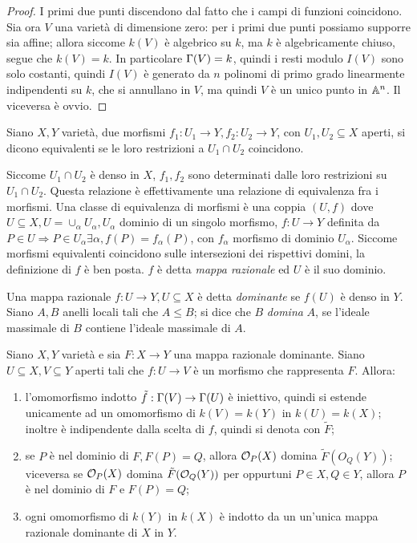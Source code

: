     \begin{proof}
        I primi due punti discendono dal fatto che i campi di funzioni coincidono.\\
        Sia ora $V$ una varietà di dimensione zero: per i primi due punti possiamo supporre sia affine; allora siccome $k(V)$ è algebrico su $k$, ma $k$ è algebricamente chiuso, segue che $k(V) = k$. 
        In particolare $\Gamma(V) = k$, quindi i resti modulo $I(V)$ sono solo costanti, quindi $I(V)$ è generato da $n$ polinomi di primo grado linearmente indipendenti su $k$, che si annullano in $V$, 
        ma quindi $V$ è un unico punto in $\mathbb{A}^n$. Il viceversa è ovvio.
    \end{proof} 
    \begin{definizione}
        Siano $X,Y$ varietà, due morfismi $f_1 : U_1 \to Y, f_2 : U_2 \to Y$, con $U_1,U_2 \subseteq X$ aperti, si dicono equivalenti se le loro restrizioni a $U_1 \cap U_2$ coincidono.
    \end{definizione}
    Siccome $U_1 \cap U_2$ è denso in $X$, $f_1,f_2$ sono determinati dalle loro restrizioni su $U_1 \cap U_2$. Questa relazione è effettivamente una relazione di equivalenza fra i morfismi. Una classe di equivalenza di morfismi è una 
    coppia $(U,f)$ dove $U \subseteq X, U = \cup_{\alpha} U_{\alpha}, U_{\alpha}$ dominio di un singolo morfismo, $f : U \to Y$ definita da $P \in U \Longrightarrow P \in U_{\alpha} \exists \alpha, f(P) = f_{\alpha}(P)$, con $f_{\alpha}$ 
    morfismo di dominio $U_{\alpha}$. Siccome morfismi equivalenti coincidono sulle intersezioni dei rispettivi domini, la definizione di $f$ è ben posta. $f$ è detta \emph{mappa razionale} ed $U$ è il suo dominio.
    \begin{definizione}
        Una mappa razionale $f : U \to Y, U \subseteq X$ è detta \emph{dominante} se $f(U)$ è denso in $Y$.\\
        Siano $A,B$ anelli locali tali che $A \leq B$; si dice che $B$ \emph{domina} $A$, se l'ideale massimale di $B$ contiene l'ideale massimale di $A$. 
    \end{definizione}
    \begin{proposizione}\label{prop:techn1}
        Siano $X,Y$ varietà e sia $F : X \to Y$ una mappa razionale dominante. Siano $U \subseteq X, V \subseteq Y$ aperti tali che $f : U \to V$ è un morfismo che rappresenta $F$. Allora: \begin{enumerate}
            \item l'omomorfismo indotto $\tilde{f} : \Gamma(V) \to \Gamma(U)$ è iniettivo, quindi si estende unicamente ad un omomorfismo di $k(V) = k(Y)$ in $k(U) = k(X)$; inoltre è indipendente dalla scelta di $f$, quindi si denota con $\tilde{F}$;
            \item se $P$ è nel dominio di $F, F(P) = Q$, allora $\mathcal{O}_P(X)$ domina $\tilde{F}(O_Q(Y))$; viceversa se $\mathcal{O}_P(X)$ domina $\tilde{F}(\mathcal{O}_Q(Y))$ per oppurtuni $P \in X, Q \in Y$, allora $P$ è nel dominio di $F$ e $F(P) = Q$;
            \item ogni omomorfismo di $k(Y)$ in $k(X)$ è indotto da un un'unica mappa razionale dominante di $X$ in $Y$.
         \end{enumerate}
    \end{proposizione}
